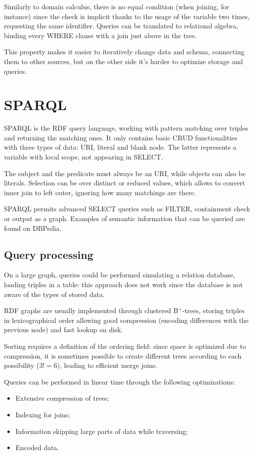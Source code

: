 Similarly to domain calculus, there is no equal condition (when joining, for instance) since the check is implicit thanks to the usage of the variable two times, requesting the same identifier. Queries can be translated to relational algebra, binding every WHERE clause with a join just above in the tree.

This property makes it easier to iteratively change data and schema, connecting them to other sources, but on the other side it's harder to optimize storage and queries.

\section{SPARQL}
SPARQL is the RDF query language, working with pattern matching over triples and returning the matching ones. It only contains basic CRUD functionalities with three types of data: URI, literal and blank node. The latter represents a variable with local scope, not appearing in SELECT.

The subject and the predicate must always be an URI, while objects can also be literals. Selection can be over distinct or reduced values, which allows to convert inner join to left outer, ignoring how many matchings are there.

SPARQL permits advanced SELECT queries such as FILTER, containment check or output as a graph. Examples of semantic information that can be queried are found on DBPedia.

\subsection{Query processing}
On a large graph, queries could be performed simulating a relation database, loading triples in a table: this approach does not work since the database is not aware of the types of stored data. 

RDF graphs are usually implemented through clustered B$^+$-trees, storing triples in lexicographical order allowing good compression (encoding differences with the previous node) and fast lookup on disk.

Sorting requires a definition of the ordering field: since space is optimized due to compression, it is sometimes possible to create different trees according to each possibility ($3! = 6$), leading to efficient merge joins. 

Queries can be performed in linear time through the following optimizations:
\begin{itemize}
	\item Extensive compression of trees;
	\item Indexing for joins;
	\item Information skipping large parts of data while traversing;
	\item Encoded data.
\end{itemize}

